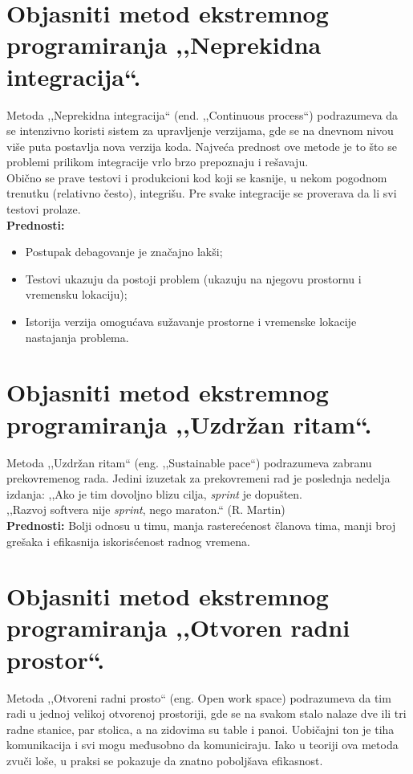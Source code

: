 \documentclass[a4paper]{article}
\begin{document}
\section{Objasniti metod ekstremnog programiranja ,,Neprekidna integracija``.}
  Metoda ,,Neprekidna integracija`` (end. ,,Continuous process``) podrazumeva da se intenzivno 
  koristi sistem za upravljenje verzijama, gde se na dnevnom nivou više puta postavlja nova
  verzija koda. Najveća prednost ove metode je to što se problemi prilikom integracije vrlo 
  brzo prepoznaju i rešavaju. \\
  \indent Obično se prave testovi i produkcioni kod koji se kasnije, u nekom pogodnom trenutku (relativno 
  često), integrišu. Pre svake integracije se proverava da li svi testovi prolaze. \\
  \textbf{Prednosti:}
  \begin{itemize}
    \item Postupak debagovanje je značajno lakši;
    \item Testovi ukazuju da postoji problem (ukazuju na njegovu prostornu i vremensku lokaciju);
    \item Istorija verzija omogućava sužavanje prostorne i vremenske lokacije nastajanja problema.
  \end{itemize}

\section{Objasniti metod ekstremnog programiranja ,,Uzdržan ritam``.}
  Metoda ,,Uzdržan ritam`` (eng. ,,Sustainable pace``) podrazumeva zabranu prekovremenog rada.
  Jedini izuzetak za prekovremeni rad je poslednja nedelja izdanja: ,,Ako je tim dovoljno blizu
  cilja, \textit{sprint} je dopušten. \\

  ,,Razvoj softvera nije \textit{sprint}, nego maraton.``  (R. Martin)\\

  \textbf{Prednosti:} Bolji odnosu u timu, manja rasterećenost članova tima, manji broj grešaka i
  efikasnija iskorisćenost radnog vremena.

\section{Objasniti metod ekstremnog programiranja ,,Otvoren radni prostor``.}
  Metoda ,,Otvoreni radni prosto`` (eng. Open work space) podrazumeva da tim radi u jednoj
  velikoj otvorenoj prostoriji, gde se na svakom stalo nalaze dve ili tri radne stanice, 
  par stolica, a na zidovima su table i panoi. Uobičajni ton je tiha komunikacija i svi mogu
  međusobno da komuniciraju. Iako u teoriji ova metoda zvuči loše, u praksi se pokazuje da znatno 
  poboljšava efikasnost.
\end{document}

